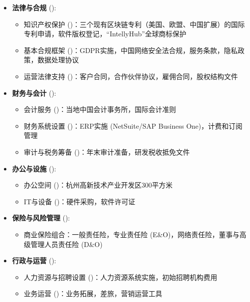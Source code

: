 \documentclass[11pt, a4paper, oneside]{article}
\begin{document}
\begin{itemize}
    \item \textbf{法律与合规} ():
    \begin{itemize}
        \item 知识产权保护 ()：三个现有区块链专利（美国、欧盟、中国扩展）的国际专利申请，软件版权登记，“IntellyHub”全球商标保护
        \item 基本合规框架 ()：GDPR实施，中国网络安全法合规，服务条款，隐私政策，数据处理协议
        \item 运营法律支持 ()：客户合同，合作伙伴协议，雇佣合同，股权结构文件
    \end{itemize}
    
    \item \textbf{财务与会计} ():
    \begin{itemize}
        \item 会计服务 ()：当地中国会计事务所，国际会计准则
        \item 财务系统设置 ()：ERP实施 (NetSuite/SAP Business One)，计费和订阅管理
        \item 审计与税务筹备 ()：年末审计准备，研发税收抵免文件
    \end{itemize}
    
    \item \textbf{办公与设施} ():
    \begin{itemize}
        \item 办公空间 ()：杭州高新技术产业开发区300平方米
        \item IT与设备 ()：硬件采购，软件许可证
    \end{itemize}
    
    \item \textbf{保险与风险管理} ():
    \begin{itemize}
        \item 商业保险组合：一般责任险，专业责任险 (E\&O)，网络责任险，董事与高级管理人员责任险 (D\&O)
    \end{itemize}
    
    \item \textbf{行政与运营} ():
    \begin{itemize}
        \item 人力资源与招聘设置 ()：人力资源系统实施，初始招聘机构费用
        \item 业务运营 ()：业务拓展，差旅，营销运营工具
    \end{itemize}
\end{itemize}
\end{document}

